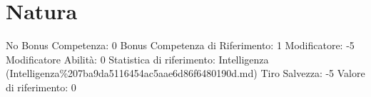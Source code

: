 \section{Natura}\label{natura}

\begin{description}
\tightlist
\item[Tags: ABI]
No Bonus Competenza: 0 Bonus Competenza di Riferimento: 1 Modificatore:
-5 Modificatore Abilità: 0 Statistica di riferimento: Intelligenza
(Intelligenza\%207ba9da5116454ac5aae6d86f6480190d.md) Tiro Salvezza: -5
Valore di riferimento: 0
\end{description}
